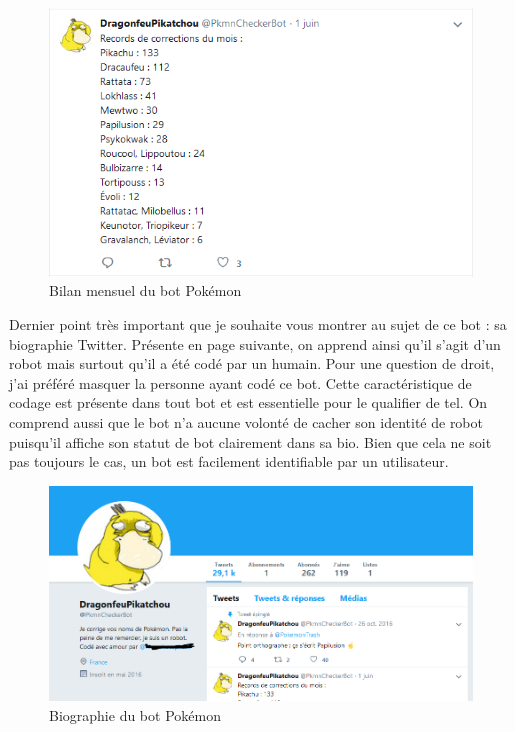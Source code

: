 \documentclass[12pt]{report}
\begin{document}
\begin{figure}[h]
    \includegraphics[width=180mm]{BotTwitterPokemon3.PNG}
    \caption{Bilan mensuel du bot Pokémon}
\label{fig:Bilan mensuel du bot Pokémon}
  \end{figure}
  
\newpage
Dernier point très important que je souhaite vous montrer au sujet de ce bot : sa biographie Twitter. Présente en page suivante, on apprend ainsi qu'il s'agit d'un robot mais surtout qu'il a été codé par un humain. Pour une question de droit, j'ai préféré masquer la personne ayant codé ce bot. Cette caractéristique de codage est présente dans tout bot et est essentielle pour le qualifier de tel. On comprend aussi que le bot n'a aucune volonté de cacher son identité de robot puisqu'il affiche son statut de bot clairement dans sa bio. Bien que cela ne soit pas toujours le cas, un bot est facilement identifiable par un utilisateur.

\begin{figure}[h]
    \includegraphics[width=220mm]{BotTwitterPokemon.PNG}
    \caption{Biographie du bot Pokémon}
\label{fig:Biographie du bot Pokémon}
  \end{figure}
  
\end{document}
